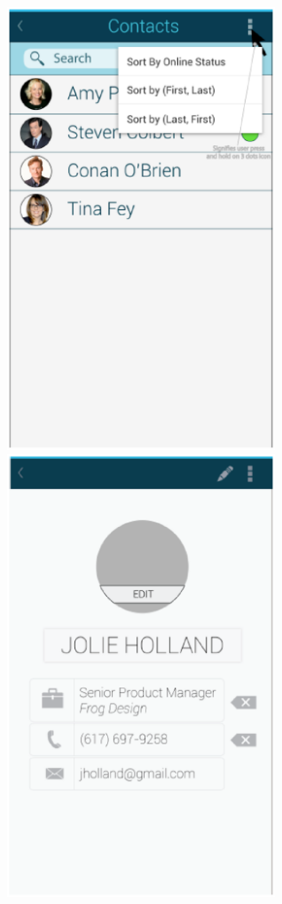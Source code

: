 \documentclass[12pt, letterpaper]{article}
\begin{document}
\begin{center}
\includegraphics[width=0.6\textwidth]{contacts.eps}
\clearpage
\includegraphics[width=0.6\textwidth]{personalInfo.eps}
\clearpage

\end{center}
\end{document}
